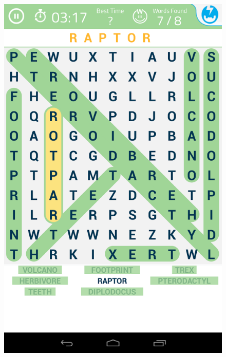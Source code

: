 \documentclass{beamer}
\begin{document}
\begin{frame}
\begin{columns}[c]
\begin{column}{5cm}
\begin{figure}
\includegraphics[scale=0.15]{word_puzzle.png}
\end{figure}
\end{column}
\end{columns}
\end{frame}
\end{document}
